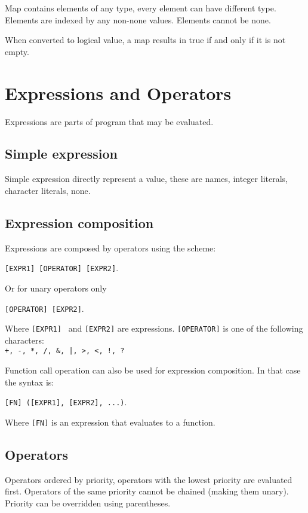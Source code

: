 \documentclass[a4paper,11pt,openany]{article}
\begin{document}
Map contains elements of any type, every element can have different type.
Elements are indexed by any non-none values. Elements cannot be none.
	
When converted to logical value, a map results in true if and only if it is not empty.
	
\section{Expressions and Operators}

Expressions are parts of program that may be evaluated.

\subsection{Simple expression}

Simple expression directly represent a value, these are names, integer literals, character literals, none. 



\subsection{Expression composition}

Expressions are composed by operators using the scheme:

\texttt{[EXPR1] [OPERATOR] [EXPR2]}.

Or for unary operators only

\texttt{[OPERATOR] [EXPR2]}.

Where \texttt{[EXPR1] } and \texttt{[EXPR2]} are expressions. \texttt{[OPERATOR]} is one of the following characters:\\ \texttt{+, -, *, /, \&, |, >, <, !, ?}

Function call operation can also be used for expression composition. In that case the syntax is: 

\texttt{[FN] ([EXPR1], [EXPR2], ...)}.

Where \texttt{[FN]} is an expression that evaluates to a function.

\subsection{Operators}

Operators ordered by priority, operators with the lowest priority are evaluated first. Operators of the same priority cannot be chained (making them unary). Priority can be overridden using parentheses.
\end{document}
